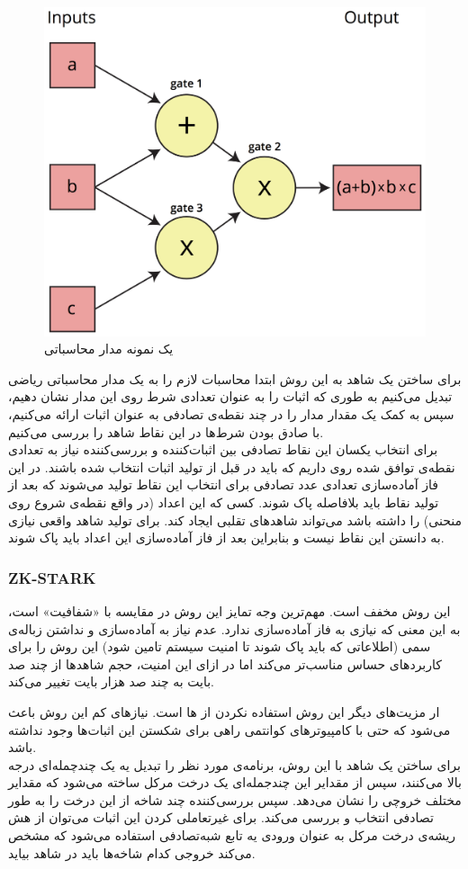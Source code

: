 \begin{figure}[bh]
	\centering
	\includegraphics[width=.5\linewidth]{arithmetic-circuit.png}
	\caption {یک نمونه مدار محاسباتی}
	\label{fig:arithmetic}
\end{figure}

برای ساختن یک شاهد به این روش ابتدا محاسبات لازم را به یک مدار محاسباتی ریاضی تبدیل می‌کنیم به طوری که اثبات را به عنوان تعدادی شرط روی این مدار نشان دهیم، سپس به کمک یک
مقدار مدار را در چند نقطه‌ی تصادفی به عنوان اثبات ارائه می‌کنیم، با صادق بودن شرط‌ها در این نقاط شاهد را بررسی می‌کنیم. 
\\
برای انتخاب یکسان این نقاط تصادفی بین اثبات‌کننده و بررسی‌کننده نیاز به تعدادی نقطه‌ی توافق شده روی  داریم که باید در قبل از تولید اثبات انتخاب شده باشند. در این فاز آماده‌سازی تعدادی عدد تصادفی برای انتخاب این نقاط تولید می‌شوند که بعد از تولید نقاط باید بلافاصله پاک شوند. کسی که این اعداد (در واقع نقطه‌ی شروع روی منحنی) را داشته باشد می‌تواند شاهد‌های تقلبی ایجاد کند. برای تولید شاهد واقعی نیازی به دانستن این نقاط نیست و بنابراین بعد از فاز آماده‌سازی این اعداد باید پاک شوند. 
\subsubsection{ZK-STARK}
این روش مخفف
است. مهم‌ترین وجه تمایز این روش در مقایسه با
 «شفافیت»
است، به این معنی که نیازی به فاز آماده‌سازی ندارد. عدم نیاز به آماده‌سازی و نداشتن زباله‌ی سمی (اطلاعاتی که باید پاک شوند تا امنیت سیستم تامین شود) این روش را برای کاربرد‌های حساس مناسب‌تر می‌کند اما در ازای این امنیت، حجم شاهد‌ها از چند صد بایت به چند صد هزار بایت تغییر می‌کند.
\par
ار مزیت‌های دیگر این روش استفاده نکردن از 
ها
است. نیاز‌های کم این روش باعث می‌شود که حتی با کامپیوتر‌های کوانتمی
 راهی برای شکستن این اثبات‌ها وجود نداشته باشد.
\\
برای ساختن یک شاهد با این روش، برنامه‌ی مورد نظر را تبدیل یه یک چندچمله‌ای درجه بالا می‌کنند، سپس از مقدایر این چندجمله‌ای یک درخت مرکل ساخته می‌شود که مقدایر مختلف خروچی را نشان می‌دهد. سپس بررسی‌کننده چند شاخه از این درخت را به طور تصادفی انتخاب و بررسی می‌کند. برای غیرتعاملی کردن این اثبات می‌توان از هش ریشه‌ی درخت مرکل به عنوان ورودی یه تابع شبه‌تصادفی
استفاده می‌شود که مشخص می‌کند خروجی کدام شاخه‌ها باید در شاهد بیاید. 





